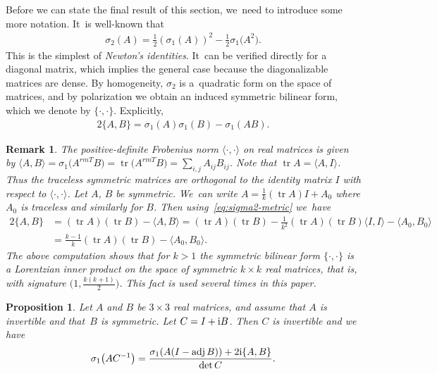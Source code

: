 \documentclass[10pt,a4paper]{amsart}
\def\adj{\operatorname{adj}}
\def\tr{\operatorname{tr}}
\newtheorem{Proposition}[Theorem]{Proposition}
\newtheorem{Remark}[Theorem]{Remark}}
\numberwithin{equation}{section}
\begin{document}
Before we can state the final result of this section, we~need to introduce some more notation. It~is well-known that
\begin{gather*} %
\sigma_2 (A) = \frac{1}{2} ( \sigma_1 (A) )^2 - \frac{1}{2} \sigma_1 \big(A^2\big).
\end{gather*}
This is the simplest of \emph{Newton's identities}. It~can be verified directly for a diagonal matrix, which implies the general case because the diagonalizable matrices are dense. By homogeneity, $\sigma_2$ is a~quadratic form on the space of matrices, and by polarization we obtain an induced symmetric bilinear form, which we denote by $\{ \cdot, \cdot \}$. Explicitly,
\begin{gather} \label{eq:sigma2-metric}
2 \{ A, B \} = \sigma_1 (A) \sigma_1 (B) - \sigma_1 (AB).
\end{gather}

\begin{Remark} \label{rmk:sigma2-metric}
The positive-definite Frobenius norm $\langle \cdot, \cdot \rangle$ on real matrices is given by $\langle A, B \rangle = \sigma_1 \big(A^{rm T} B\big) = \tr \big(A^{rm T} B\big) = \sum_{i,j} A_{ij} B_{ij}$. Note that $\tr A = \langle A, I \rangle$. Thus the traceless symmetric matrices are orthogonal to the identity matrix $I$ with respect to $\langle \cdot, \cdot \rangle$. Let $A$, $B$ be symmetric. We~can write $A = \frac{1}{k} (\tr A) I + A_0$ where $A_0$ is traceless and similarly for $B$. Then using~\eqref{eq:sigma2-metric} we~have
\begin{align*}
2 \{ A, B \} & = (\tr A) (\tr B) - \langle A, B \rangle = (\tr A) (\tr B) - \frac{1}{k^2} (\tr A) (\tr B) \langle I, I \rangle - \langle A_0, B_0 \rangle \\
& = \frac{k-1}{k} (\tr A) (\tr B) - \langle A_0, B_0 \rangle.
\end{align*}
The above computation shows that for $k > 1$ the symmetric bilinear form $\{ \cdot, \cdot \}$ is a \emph{Lorentzian} inner product on the space of symmetric $k \times k$ real matrices, that is, with signature $\big(1, \frac{k(k+1)}{2}\big)$. This fact is used several times in this paper.
\end{Remark}

\begin{Proposition} \label{prop:sigma-adj-2}
Let $A$ and $B$ be $3 \times 3$ \emph{real} matrices, and assume that $A$ is invertible and that~$B$ is symmetric. Let $C = I + {\rm i} B$. Then $C$ is invertible and we have
\begin{gather*} %
\sigma_1 \big(AC^{-1}\big) = \frac{\sigma_1(A(I - \adj B)) + 2{\rm i} \{ A, B \} }{\det C}.
\end{gather*}
\end{Proposition}
\end{document}
